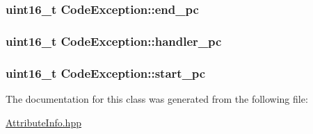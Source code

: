 \subsubsection[{\texorpdfstring{end\+\_\+pc}{end_pc}}]{\setlength{\rightskip}{0pt plus 5cm}uint16\+\_\+t Code\+Exception\+::end\+\_\+pc}\hypertarget{class_code_exception_a357306bca81fcf2e7bc9dfcedc9c4f96}{}\label{class_code_exception_a357306bca81fcf2e7bc9dfcedc9c4f96}
\subsubsection[{\texorpdfstring{handler\+\_\+pc}{handler_pc}}]{\setlength{\rightskip}{0pt plus 5cm}uint16\+\_\+t Code\+Exception\+::handler\+\_\+pc}\hypertarget{class_code_exception_a8c66a2462bd2668d7824e7f3745385d6}{}\label{class_code_exception_a8c66a2462bd2668d7824e7f3745385d6}
\subsubsection[{\texorpdfstring{start\+\_\+pc}{start_pc}}]{\setlength{\rightskip}{0pt plus 5cm}uint16\+\_\+t Code\+Exception\+::start\+\_\+pc}\hypertarget{class_code_exception_a18754b054d8331acbad758612698e599}{}\label{class_code_exception_a18754b054d8331acbad758612698e599}


The documentation for this class was generated from the following file\+:\begin{DoxyCompactItemize}
\item 
\hyperlink{_attribute_info_8hpp}{Attribute\+Info.\+hpp}\end{DoxyCompactItemize}
